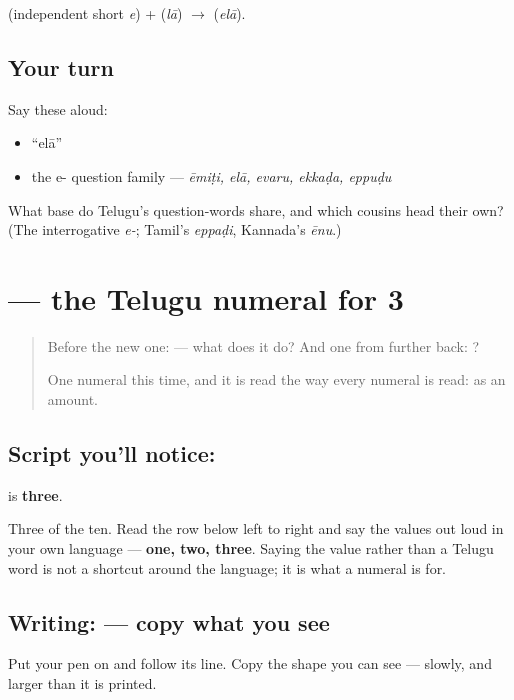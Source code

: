 \begin{sounds}
 (independent short \emph{e}) +  (\emph{lā}) $\to$  (\emph{elā}).
\end{sounds}

\subsection*{Your turn}
Say these aloud:

\begin{itemize}
\raggedright
  \item \textquotedblleft{}elā\textquotedblright{}
  \item the e- question family — \emph{ēmiṭi, elā, evaru, ekkaḍa, eppuḍu}
\end{itemize}

\begin{tcolorbox}[breakable,colback=teal!4,colframe=teal!35!black,title={Before you move on}]
What base do Telugu's question-words share, and which cousins head their own? (The interrogative \emph{e-}; Tamil's \emph{eppaḍi}, Kannada's \emph{ēnu}.)
\end{tcolorbox}
\section[\texorpdfstring{\te{౩} (3)}{౩ (3)}]{ — the Telugu numeral for 3}

\label{lesson:TE-S142-digit-3}



\begin{quote}
Before the new one:  — what does it do? And one from further back: ?

One numeral this time, and it is read the way every numeral is read: as an amount.
\end{quote}

\subsection*{Script you'll notice: }
\textbf{} is \textbf{three}.

Three of the ten. Read the row below left to right and say the values out loud in your own language — \textbf{one, two, three}. Saying the value rather than a Telugu word is not a shortcut around the language; it is what a numeral is for.

\subsection*{Writing:  — copy what you see}
Put your pen on  and follow its line. Copy the shape you can see — slowly, and larger than it is printed.

